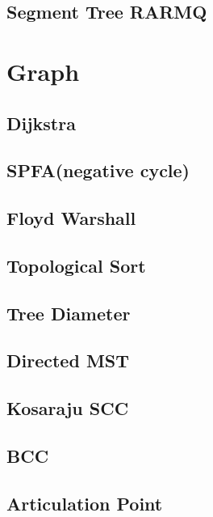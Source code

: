     \subsection{Segment Tree RARMQ}
        

\section{Graph}
    \subsection{Dijkstra}
        
    \subsection{SPFA(negative cycle)}
        
    \subsection{Floyd Warshall}
        
    \subsection{Topological Sort}
        
    \subsection{Tree Diameter}
        
    \subsection{Directed MST}
        
    \subsection{Kosaraju SCC}
        
    \subsection{BCC}
        
    \subsection{Articulation Point}
        
